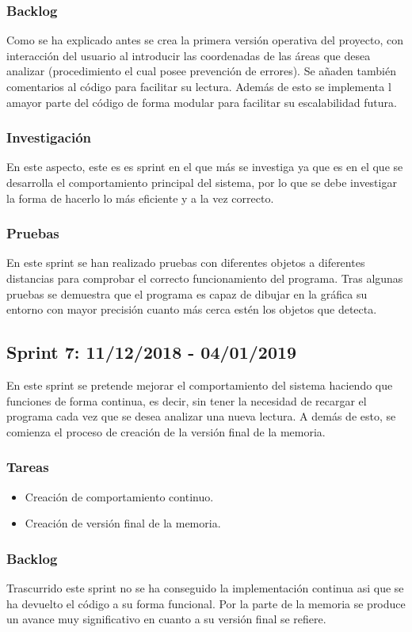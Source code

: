 \subsubsection{Backlog}
Como se ha explicado antes se crea la primera versión operativa del proyecto, con interacción del usuario al introducir las coordenadas de las áreas que desea analizar (procedimiento el cual posee prevención de errores). Se añaden también comentarios al código para facilitar su lectura. Además de esto se implementa l amayor parte del código de forma modular para facilitar su escalabilidad futura.
\subsubsection{Investigación}
En este aspecto, este es es sprint en el que más se investiga ya que es en el que se desarrolla el comportamiento principal del sistema, por lo que se debe investigar la forma de hacerlo lo más eficiente y a la vez correcto.
\subsubsection{Pruebas}
En este sprint se han realizado pruebas con diferentes objetos a diferentes distancias para comprobar el correcto funcionamiento del programa. Tras algunas pruebas se demuestra que el programa es capaz de dibujar en la gráfica su entorno con mayor precisión cuanto más cerca estén los objetos que detecta.

\subsection{Sprint 7: 11/12/2018 - 04/01/2019}
En este sprint se pretende mejorar el comportamiento del sistema haciendo que funciones de forma continua, es decir, sin tener la necesidad de recargar el programa cada vez que se desea analizar una nueva lectura. A demás de esto, se comienza el proceso de creación de la versión final de la memoria.
\subsubsection{Tareas}
\begin{itemize}
	\item Creación de comportamiento continuo.
	\item Creación de versión final de la memoria.
\end{itemize}
\subsubsection{Backlog}
Trascurrido este sprint no se ha conseguido la implementación continua asi que se ha devuelto el código a su forma funcional. Por la parte de la memoria se produce un avance muy significativo en cuanto a su versión final se refiere.
